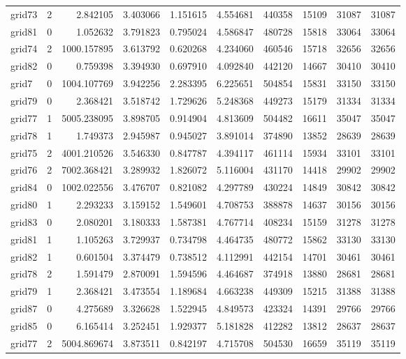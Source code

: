 \documentclass[../../../thesis.tex]{subfiles}
\begin{document}
\begin{longtable}{|l|r|r|r|r|r|r|r|r|r|}
grid73 & 2 & 2.842105 & 3.403066 & 1.151615 & 4.554681 & 440358 & 15109 & 31087 & 31087 \\
grid81 & 0 & 1.052632 & 3.791823 & 0.795024 & 4.586847 & 480728 & 15818 & 33064 & 33064 \\
grid74 & 2 & 1000.157895 & 3.613792 & 0.620268 & 4.234060 & 460546 & 15718 & 32656 & 32656 \\
grid82 & 0 & 0.759398 & 3.394930 & 0.697910 & 4.092840 & 442120 & 14667 & 30410 & 30410 \\
grid7 & 0 & 1004.107769 & 3.942256 & 2.283395 & 6.225651 & 504854 & 15831 & 33150 & 33150 \\
grid79 & 0 & 2.368421 & 3.518742 & 1.729626 & 5.248368 & 449273 & 15179 & 31334 & 31334 \\
grid77 & 1 & 5005.238095 & 3.898705 & 0.914904 & 4.813609 & 504482 & 16611 & 35047 & 35047 \\
grid78 & 1 & 1.749373 & 2.945987 & 0.945027 & 3.891014 & 374890 & 13852 & 28639 & 28639 \\
grid75 & 2 & 4001.210526 & 3.546330 & 0.847787 & 4.394117 & 461114 & 15934 & 33101 & 33101 \\
grid76 & 2 & 7002.368421 & 3.289932 & 1.826072 & 5.116004 & 431170 & 14418 & 29902 & 29902 \\
grid84 & 0 & 1002.022556 & 3.476707 & 0.821082 & 4.297789 & 430224 & 14849 & 30842 & 30842 \\
grid80 & 1 & 2.293233 & 3.159152 & 1.549601 & 4.708753 & 388878 & 14637 & 30156 & 30156 \\
grid83 & 0 & 2.080201 & 3.180333 & 1.587381 & 4.767714 & 408234 & 15159 & 31278 & 31278 \\
grid81 & 1 & 1.105263 & 3.729937 & 0.734798 & 4.464735 & 480772 & 15862 & 33130 & 33130 \\
grid82 & 1 & 0.601504 & 3.374479 & 0.738512 & 4.112991 & 442154 & 14701 & 30461 & 30461 \\
grid78 & 2 & 1.591479 & 2.870091 & 1.594596 & 4.464687 & 374918 & 13880 & 28681 & 28681 \\
grid79 & 1 & 2.368421 & 3.473554 & 1.189684 & 4.663238 & 449309 & 15215 & 31388 & 31388 \\
grid87 & 0 & 4.275689 & 3.326628 & 1.522945 & 4.849573 & 423324 & 14391 & 29766 & 29766 \\
grid85 & 0 & 6.165414 & 3.252451 & 1.929377 & 5.181828 & 412282 & 13812 & 28637 & 28637 \\
grid77 & 2 & 5004.869674 & 3.873511 & 0.842197 & 4.715708 & 504530 & 16659 & 35119 & 35119 \\

\end{longtable}
\end{document}
